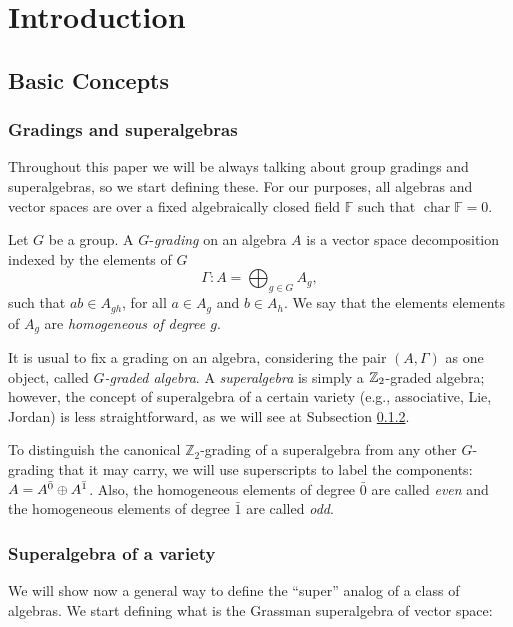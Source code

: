 \chapter*{Introduction}

\section{Basic Concepts}

\subsection{Gradings and superalgebras} Throughout this paper we will be always talking about group gradings and superalgebras, so we start defining these. For our purposes, all algebras and vector spaces are over a fixed algebraically closed field $\mathbb{F}$ such that $\operatorname{char} \mathbb{F}=0$.

\begin{defi}\label{def:grading}
Let $G$ be a group. A $G$-\emph{grading} on an algebra $A$ is a vector space decomposition indexed by the elements of $G$
\[\Gamma : A= \bigoplus_{g \in G} A_g,\]
such that $ab \in A_{gh}$, for all $a \in A_{g}$ and $b \in A_{h}$. We say that the elements elements of $A_g$ are \emph{homogeneous of degree $g$}.
\end{defi}

It is usual to fix a grading on an algebra, considering the pair $(A, \Gamma)$ as one object, called \emph{$G$-graded algebra}. A \emph{superalgebra} is simply a $\mathbb{Z}_{2}$-graded algebra; however, the concept of superalgebra of a certain variety (e.g., associative, Lie, Jordan) is less straightforward, as we will see at Subsection \ref{subsec:super-analog}.

To distinguish the canonical $\mathbb{Z}_2$-grading of a superalgebra from any other $G$-grading that it may carry, we will use superscripts to label the components: $A=A^{\bar0} \oplus A^{\bar1}$. Also, the homogeneous elements of degree $\bar0$ are called \emph{even} and the homogeneous elements of degree $\bar1$ are called \emph{odd}.

\subsection{Superalgebra of a variety}\label{subsec:super-analog}

We will show now a general way to define the ``super'' analog of a class of algebras. We start defining what is the Grassman superalgebra of vector space: 


